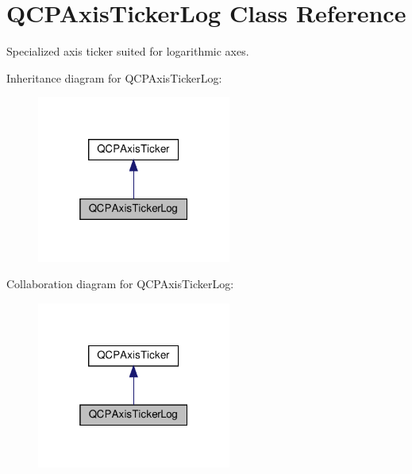 \hypertarget{classQCPAxisTickerLog}{}\section{Q\+C\+P\+Axis\+Ticker\+Log Class Reference}
\label{classQCPAxisTickerLog}


Specialized axis ticker suited for logarithmic axes.  




Inheritance diagram for Q\+C\+P\+Axis\+Ticker\+Log\+:\nopagebreak
\begin{figure}[H]
\begin{center}
\leavevmode
\includegraphics[width=181pt]{classQCPAxisTickerLog__inherit__graph}
\end{center}
\end{figure}


Collaboration diagram for Q\+C\+P\+Axis\+Ticker\+Log\+:\nopagebreak
\begin{figure}[H]
\begin{center}
\leavevmode
\includegraphics[width=181pt]{classQCPAxisTickerLog__coll__graph}
\end{center}
\end{figure}
